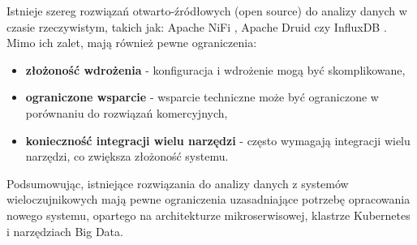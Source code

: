 Istnieje szereg rozwiązań otwarto-źródłowych (open source) do analizy danych w czasie rzeczywistym, takich jak: Apache NiFi \cite{apache_nifi},
Apache Druid \cite{apache_druid} czy InfluxDB \cite{influxdb}. Mimo ich zalet, mają również pewne ograniczenia:

\begin{itemize}
    \item \textbf{złożoność wdrożenia} - konfiguracja i wdrożenie mogą być skomplikowane,
    \item \textbf{ograniczone wsparcie} - wsparcie techniczne może być ograniczone w porównaniu do rozwiązań komercyjnych,
    \item \textbf{konieczność integracji wielu narzędzi} - często wymagają integracji wielu narzędzi, co zwiększa złożoność systemu.
\end{itemize}

Podsumowując, istniejące rozwiązania do analizy danych z systemów wieloczujnikowych mają pewne ograniczenia uzasadniające potrzebę opracowania nowego systemu, opartego na architekturze mikroserwisowej, klastrze Kubernetes i narzędziach Big Data.